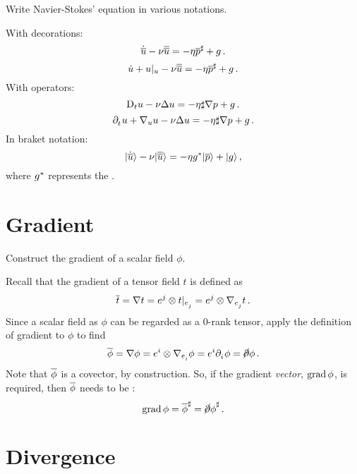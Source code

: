 Write Navier-Stokes' equation in various notations.~\cite{misner1973}

With decorations:
%
\begin{equation*}
  \dot{\overline{u}} - \nu\overline{\overline{u}} = -\eta{\overline{p}}^{\sharp} + g\,.
\end{equation*}
%
\begin{equation*}
  \dot{u} + {u}|_{u} - \nu\overline{\overline{u}} = -\eta{\overline{p}}^{\sharp} + g\,.
\end{equation*}
%
With operators:
%
\begin{equation*}
  \mathrm{D}_{t}u - \nu\Delta u = -\eta\sharp\nabla p + g\,.
\end{equation*}
%
\begin{equation*}
  \cpd t\vel + \ocder\vel\vel - \kkvisc\olap\vel = -\spvol\oscov\ograd\press + \grav\,.
\end{equation*}
%
In braket notation:
%
\begin{equation*}
  \lvert\dot{\overline{u}}\rangle - \nu\lvert\overline{\overline{u}}\rangle = -\eta g^{*}\lvert\overline{p}\rangle + \lvert g\rangle\,,
\end{equation*}
%
where $g^{*}$ represents the .


\section{Gradient}
\label{sec:gradient}

Construct the gradient of a scalar field $\phi$.

Recall that the gradient of a tensor field $t$ is defined as
%
\begin{equation*}
  \grad t = \ograd t
  = \tbcov j\tprod\cder t{\tbvec j}
  = \tbcov j\tprod\ocder{\tbvec j}t\,.
\end{equation*}
%
Since a scalar field as $\phi$ can be regarded as a 0-rank tensor, apply the definition of gradient to $\phi$ to find
%
\begin{equation*}
  \grad\phi = \ograd\phi
  = \tbcov i\tprod\ocder{\tbvec i}\phi
  = \tbcov i\cpd i\phi
  = \slashed\partial\phi\,.
\end{equation*}
%
Note that $\overline{\phi}$ is a covector, by construction. So, if the gradient \emph{vector}, $\operatorname{grad}\phi$, is required, then $\overline{\phi}$ needs to be :
%
\begin{equation*}
  \operatorname{grad}\phi = {\overline{\phi}}^{\sharp}
  = {\cancel\partial\phi}^{\sharp}\,.
\end{equation*}


\section{Divergence}
\label{sec:divergence}

